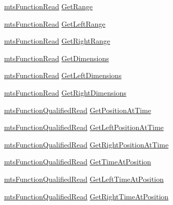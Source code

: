\begin{DoxyCompactItemize}
\item 
\hyperlink{classmts_function_read}{mts\-Function\-Read} \hyperlink{class_i_req_filter_source_video_file_abf207e05262a2eddc499216f06ef84c3}{Get\-Range}
\item 
\hyperlink{classmts_function_read}{mts\-Function\-Read} \hyperlink{class_i_req_filter_source_video_file_ac134bdfc372186b18bedeed815744459}{Get\-Left\-Range}
\item 
\hyperlink{classmts_function_read}{mts\-Function\-Read} \hyperlink{class_i_req_filter_source_video_file_a0c3ed7324a20bfa8f9513a71c1aee475}{Get\-Right\-Range}
\item 
\hyperlink{classmts_function_read}{mts\-Function\-Read} \hyperlink{class_i_req_filter_source_video_file_ae3becb0a4610a1974b2b677908d790f3}{Get\-Dimensions}
\item 
\hyperlink{classmts_function_read}{mts\-Function\-Read} \hyperlink{class_i_req_filter_source_video_file_a827465cd806623505c7dcaa359a9fb26}{Get\-Left\-Dimensions}
\item 
\hyperlink{classmts_function_read}{mts\-Function\-Read} \hyperlink{class_i_req_filter_source_video_file_a8fcb543d369f8e8c5ed59eb9fbfc2282}{Get\-Right\-Dimensions}
\item 
\hyperlink{classmts_function_qualified_read}{mts\-Function\-Qualified\-Read} \hyperlink{class_i_req_filter_source_video_file_a30e8f2209400764469938a24e1f14276}{Get\-Position\-At\-Time}
\item 
\hyperlink{classmts_function_qualified_read}{mts\-Function\-Qualified\-Read} \hyperlink{class_i_req_filter_source_video_file_a3655a5aa1f01feaadeb163549bd2020c}{Get\-Left\-Position\-At\-Time}
\item 
\hyperlink{classmts_function_qualified_read}{mts\-Function\-Qualified\-Read} \hyperlink{class_i_req_filter_source_video_file_a3a81e7e44d8a8b8e30aa682c1369b973}{Get\-Right\-Position\-At\-Time}
\item 
\hyperlink{classmts_function_qualified_read}{mts\-Function\-Qualified\-Read} \hyperlink{class_i_req_filter_source_video_file_aae273434dd6ff54f2718c2b8f7644547}{Get\-Time\-At\-Position}
\item 
\hyperlink{classmts_function_qualified_read}{mts\-Function\-Qualified\-Read} \hyperlink{class_i_req_filter_source_video_file_a2a38c6e743cdf5f55f762c57f238d7d5}{Get\-Left\-Time\-At\-Position}
\item 
\hyperlink{classmts_function_qualified_read}{mts\-Function\-Qualified\-Read} \hyperlink{class_i_req_filter_source_video_file_a76299a34b4f2f3c175b4820117c231ac}{Get\-Right\-Time\-At\-Position}
\end{DoxyCompactItemize}


